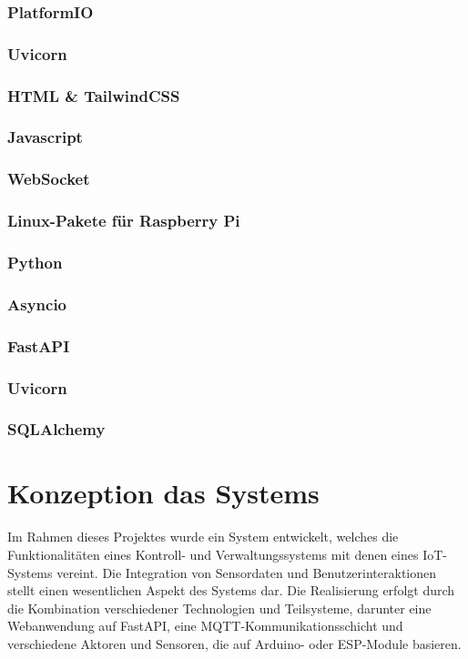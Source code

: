 \documentclass[12pt, letterpaper]{article}
\begin{document}
  \subsubsection{PlatformIO}

    \subsubsection{Uvicorn}
    \subsubsection{HTML \& TailwindCSS}
    \subsubsection{Javascript}
    \subsubsection{WebSocket}
    \subsubsection{Linux-Pakete für Raspberry Pi}
    \subsubsection{Python}
    \subsubsection{Asyncio}
    \subsubsection{FastAPI}
    \subsubsection{Uvicorn}
    \subsubsection{SQLAlchemy}

\newpage
\section{Konzeption das Systems}
\par Im Rahmen dieses Projektes wurde ein System entwickelt, welches die Funktionalitäten eines Kontroll- und Verwaltungssystems mit denen eines IoT-Systems vereint. Die Integration von Sensordaten und Benutzerinteraktionen stellt einen wesentlichen Aspekt des Systems dar. Die Realisierung erfolgt durch die Kombination verschiedener Technologien und Teilsysteme, darunter eine Webanwendung auf FastAPI, eine MQTT-Kommunikationsschicht und verschiedene Aktoren und Sensoren, die auf Arduino- oder ESP-Module basieren.
\end{document}
